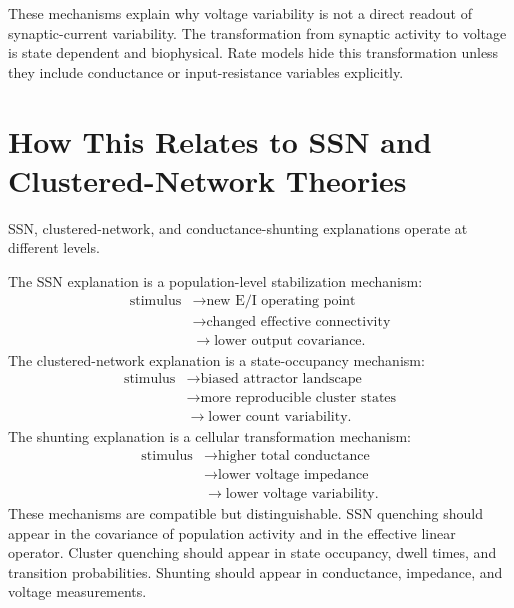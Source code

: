 These mechanisms explain why voltage variability is not a direct readout of synaptic-current variability. The transformation from synaptic activity to voltage is state dependent and biophysical. Rate models hide this transformation unless they include conductance or input-resistance variables explicitly.

\section{How This Relates to SSN and Clustered-Network Theories}
\label{sec:conductance-quenching-relation-ssn-clusters}

SSN, clustered-network, and conductance-shunting explanations operate at different levels.

The SSN explanation is a population-level stabilization mechanism:
%
\begin{equation}
  \begin{aligned}
  \text{stimulus}
  &\rightarrow \text{new E/I operating point}\\
  &\rightarrow \text{changed effective connectivity}\\
  &\rightarrow \text{lower output covariance}.
  \end{aligned}
  \label{eq:ssn-quenching-chain}
\end{equation}
%
The clustered-network explanation is a state-occupancy mechanism:
%
\begin{equation}
  \begin{aligned}
  \text{stimulus}
  &\rightarrow \text{biased attractor landscape}\\
  &\rightarrow \text{more reproducible cluster states}\\
  &\rightarrow \text{lower count variability}.
  \end{aligned}
  \label{eq:cluster-quenching-chain}
\end{equation}
%
The shunting explanation is a cellular transformation mechanism:
%
\begin{equation}
  \begin{aligned}
  \text{stimulus}
  &\rightarrow \text{higher total conductance}\\
  &\rightarrow \text{lower voltage impedance}\\
  &\rightarrow \text{lower voltage variability}.
  \end{aligned}
  \label{eq:shunting-quenching-chain}
\end{equation}
%
These mechanisms are compatible but distinguishable. SSN quenching should appear in the covariance of population activity and in the effective linear operator. Cluster quenching should appear in state occupancy, dwell times, and transition probabilities. Shunting should appear in conductance, impedance, and voltage measurements.

